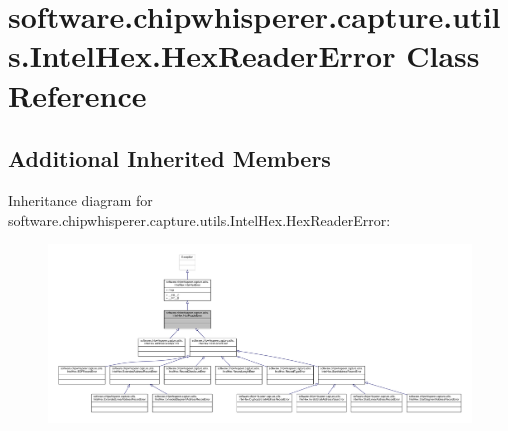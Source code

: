 \hypertarget{classsoftware_1_1chipwhisperer_1_1capture_1_1utils_1_1IntelHex_1_1HexReaderError}{}\section{software.\+chipwhisperer.\+capture.\+utils.\+Intel\+Hex.\+Hex\+Reader\+Error Class Reference}
\label{classsoftware_1_1chipwhisperer_1_1capture_1_1utils_1_1IntelHex_1_1HexReaderError}
\subsection*{Additional Inherited Members}


Inheritance diagram for software.\+chipwhisperer.\+capture.\+utils.\+Intel\+Hex.\+Hex\+Reader\+Error\+:\nopagebreak
\begin{figure}[H]
\begin{center}
\leavevmode
\includegraphics[width=350pt]{d4/da8/classsoftware_1_1chipwhisperer_1_1capture_1_1utils_1_1IntelHex_1_1HexReaderError__inherit__graph}
\end{center}
\end{figure}


